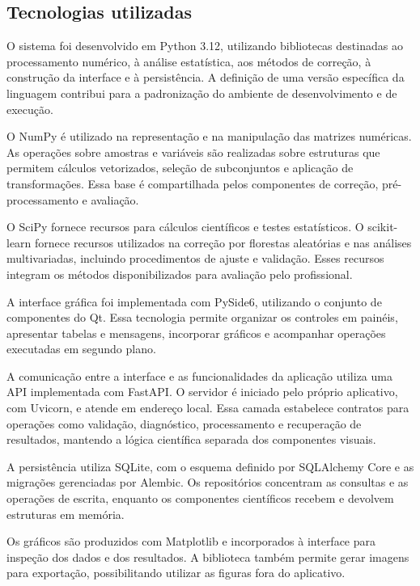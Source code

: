 \subsection{Tecnologias utilizadas}
\label{subsec:tecnologias-utilizadas}

O sistema foi desenvolvido em Python 3.12, utilizando bibliotecas destinadas ao processamento numérico, à análise estatística, aos métodos de correção, à construção da interface e à persistência. A definição de uma versão específica da linguagem contribui para a padronização do ambiente de desenvolvimento e de execução.

O NumPy é utilizado na representação e na manipulação das matrizes numéricas. As operações sobre amostras e variáveis são realizadas sobre estruturas que permitem cálculos vetorizados, seleção de subconjuntos e aplicação de transformações. Essa base é compartilhada pelos componentes de correção, pré-processamento e avaliação.

O SciPy fornece recursos para cálculos científicos e testes estatísticos. O scikit-learn fornece recursos utilizados na correção por florestas aleatórias e nas análises multivariadas, incluindo procedimentos de ajuste e validação. Esses recursos integram os métodos disponibilizados para avaliação pelo profissional.

A interface gráfica foi implementada com PySide6, utilizando o conjunto de componentes do Qt. Essa tecnologia permite organizar os controles em painéis, apresentar tabelas e mensagens, incorporar gráficos e acompanhar operações executadas em segundo plano.

A comunicação entre a interface e as funcionalidades da aplicação utiliza uma API implementada com FastAPI. O servidor é iniciado pelo próprio aplicativo, com Uvicorn, e atende em endereço local. Essa camada estabelece contratos para operações como validação, diagnóstico, processamento e recuperação de resultados, mantendo a lógica científica separada dos componentes visuais.

A persistência utiliza SQLite, com o esquema definido por SQLAlchemy Core e as migrações gerenciadas por Alembic. Os repositórios concentram as consultas e as operações de escrita, enquanto os componentes científicos recebem e devolvem estruturas em memória.

Os gráficos são produzidos com Matplotlib e incorporados à interface para inspeção dos dados e dos resultados. A biblioteca também permite gerar imagens para exportação, possibilitando utilizar as figuras fora do aplicativo.

